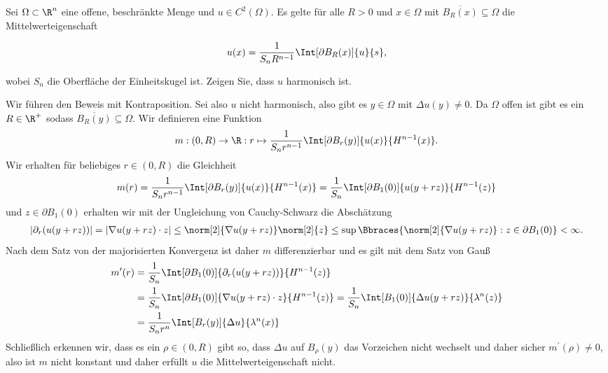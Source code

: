 
\begin{exercise}

Sei $\Omega \subset \R^n$ eine offene, beschränkte Menge und $u \in C^2(\Omega)$.
Es gelte für alle $R > 0$ und $x \in \Omega$ mit $\overline{B_R(x)} \subseteq \Omega$ die Mittelwerteigenschaft

\begin{align*}
    u(x)
    =
    \frac{1}{S_n R^{n-1}}
    \Int[\partial B_R(x)]{u}{s},
\end{align*}

wobei $S_n$ die Oberfläche der Einheitskugel ist.
Zeigen Sie, dass $u$ harmonisch ist.

\end{exercise}


\begin{solution}

Wir führen den Beweis mit Kontraposition. Sei also $u$ nicht harmonisch, also gibt es $y \in \Omega$ mit $\Delta u(y) \neq 0$. Da $\Omega$ offen ist gibt es ein $R \in \R^+$ sodass $\overline{B_R(y)} \subseteq \Omega$. Wir definieren eine Funktion
\begin{align*}
m: (0, R) \to \R : r \mapsto \frac{1}{S_n r^{n - 1}} \Int[\partial B_r(y)]{u(x)}{H^{n - 1}(x)}.
\end{align*}
Wir erhalten für beliebiges $r \in (0, R)$ die Gleichheit
\begin{align*}
m(r) = \frac{1}{S_n r^{n - 1}} \Int[\partial B_r(y)]{u(x)}{H^{n - 1}(x)} = \frac{1}{S_n}  \Int[\partial B_1(0)]{u(y + rz)}{H^{n - 1}(z)}
\end{align*}
und $z \in \partial B_1(0)$ erhalten wir mit der Ungleichung von Cauchy-Schwarz die Abschätzung
\begin{align*}
|\partial_r(u(y + rz))| = |\nabla u(y + rz) \cdot z| \leq \norm[2]{\nabla u(y + rz)} \norm[2]{z} \leq \sup\Bbraces{\norm[2]{\nabla u(y + rz)} : z \in \partial B_1(0)} < \infty.
\end{align*}
Nach dem Satz von der majorisierten Konvergenz ist daher $m$ differenzierbar und es gilt mit dem Satz von Gauß
\begin{align*}
m^\prime(r) &= \frac{1}{S_n}  \Int[\partial B_1(0)]{\partial_r(u(y + rz))}{H^{n - 1}(z)} \\
            &= \frac{1}{S_n}  \Int[\partial B_1(0)]{\nabla u(y + rz) \cdot z}{H^{n - 1}(z)} = \frac{1}{S_n}  \Int[B_1(0)]{\Delta u(y + rz)}{\lambda^n(z)} \\
            &= \frac{1}{S_nr^n}  \Int[B_r(y)]{\Delta u}{\lambda^n(x)}
\end{align*}
Schließlich erkennen wir, dass es ein $\rho \in (0, R)$ gibt so, dass $\Delta u$ auf $B_\rho(y)$ das Vorzeichen nicht wechselt und daher sicher $m^\prime(\rho) \neq 0$, also ist $m$ nicht konstant und daher erfüllt $u$ die Mittelwerteigenschaft nicht.
\end{solution}

